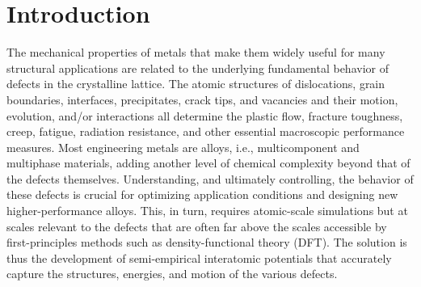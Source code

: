 \documentclass{article}
\begin{document}
\section{Introduction}
The mechanical properties of metals that make them widely useful for many structural applications are related to the underlying fundamental behavior of defects in the crystalline lattice.  The atomic structures of dislocations, grain boundaries, interfaces, precipitates, crack tips, and vacancies and their motion, evolution, and/or interactions all determine the plastic flow, fracture toughness, creep, fatigue, radiation resistance, and other essential macroscopic performance measures.  Most engineering metals are alloys, i.e., multicomponent and multiphase materials, adding another level of chemical complexity beyond that of the defects themselves.  Understanding, and ultimately controlling, the behavior of these defects is crucial for optimizing application conditions and designing new higher-performance alloys.  This, in turn, requires atomic-scale simulations but at scales relevant to the defects that are often far above the scales accessible by first-principles methods such as density-functional theory (DFT).  The solution is thus the development of semi-empirical interatomic potentials that accurately capture the structures, energies, and motion of the various defects.
\end{document}
